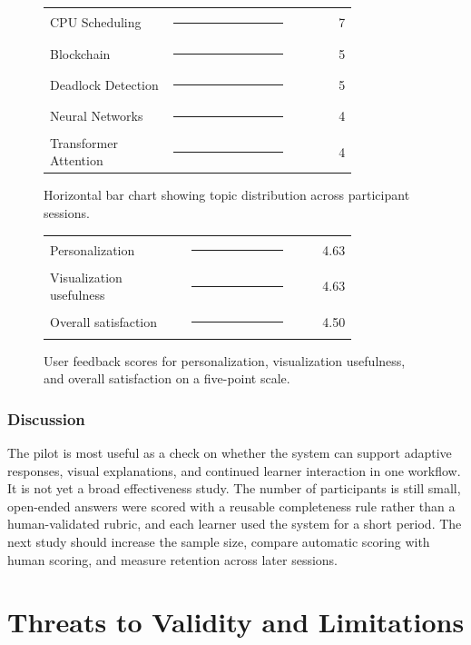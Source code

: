 \documentclass[conference]{IEEEtran}
\begin{document}
\begin{figure}[htbp]
\centering
\scriptsize
\begin{tabular}{@{}p{0.40\linewidth}p{0.40\linewidth}r@{}}
CPU Scheduling & \rule{0.98in}{5pt} & 7 \\
Blockchain & \rule{0.70in}{5pt} & 5 \\
Deadlock Detection & \rule{0.70in}{5pt} & 5 \\
Neural Networks & \rule{0.56in}{5pt} & 4 \\
Transformer Attention & \rule{0.56in}{5pt} & 4 \\
\end{tabular}
\caption{Horizontal bar chart showing topic distribution across participant sessions.}
\label{fig:topic-distribution}
\end{figure}

\begin{figure}[htbp]
\centering
\scriptsize
\begin{tabular}{@{}p{0.46\linewidth}p{0.34\linewidth}r@{}}
Personalization & \rule{0.98in}{5pt} & 4.63 \\
Visualization usefulness & \rule{0.98in}{5pt} & 4.63 \\
Overall satisfaction & \rule{0.95in}{5pt} & 4.50 \\
\end{tabular}
\caption{User feedback scores for personalization, visualization usefulness, and overall satisfaction on a five-point scale.}
\label{fig:feedback-scores}
\end{figure}
\FloatBarrier

\subsubsection{Discussion}

The pilot is most useful as a check on whether the system can support adaptive responses, visual explanations, and continued learner interaction in one workflow. It is not yet a broad effectiveness study. The number of participants is still small, open-ended answers were scored with a reusable completeness rule rather than a human-validated rubric, and each learner used the system for a short period. The next study should increase the sample size, compare automatic scoring with human scoring, and measure retention across later sessions.

\section{Threats to Validity and Limitations}
\end{document}
